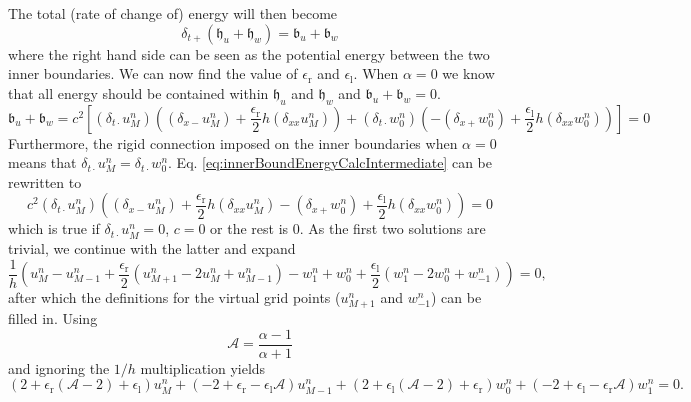 \documentclass[dvipsnames]{article}
\def\Iterm{\mathcal{A}}
\begin{document}
The total (rate of change of) energy will then become 
\begin{equation}
    \delta_{t+}\left(\mathfrak{h}_u + \mathfrak{h}_w\right) = \mathfrak{b}_u + \mathfrak{b}_w
\end{equation}
where the right hand side can be seen as the potential energy between the two inner boundaries. We can now find the value of $\epsilon_\text{r}$ and $\epsilon_\text{l}$. When $\alpha = 0$ we know that all energy should be contained within $\mathfrak{h}_u$ and $\mathfrak{h}_w$ and $\mathfrak{b}_u + \mathfrak{b}_w = 0$. 
\begin{equation}\label{eq:innerBoundEnergyCalcIntermediate}
    \mathfrak{b}_u + \mathfrak{b}_w = c^2\left[(\delta_{t\cdot}u_M^n)\left((\delta_{x-}u_M^n)+\frac{\epsilon_\text{r}}{2}h(\delta_{xx}u_M^n)\right) + (\delta_{t\cdot}w_0^n)\left(-(\delta_{x+}w_0^n)+\frac{\epsilon_\text{l}}{2}h(\delta_{xx}w_0^n)\right)\right]= 0
\end{equation}
Furthermore, the rigid connection imposed on the inner boundaries when $\alpha = 0$ means that $\delta_{t\cdot}u_M^n = \delta_{t\cdot}w_0^n$. Eq. \eqref{eq:innerBoundEnergyCalcIntermediate} can be rewritten to 
\begin{equation*}
    c^2(\delta_{t\cdot}u_M^n)\left((\delta_{x-}u_M^n)+\frac{\epsilon_\text{r}}{2}h(\delta_{xx}u_M^n) -(\delta_{x+}w_0^n)+\frac{\epsilon_\text{l}}{2}h(\delta_{xx}w_0^n)\right)= 0
\end{equation*}
which is true if $\delta_{t\cdot}u_M^n=0$, $c = 0$ or the rest is $0$. As the first two solutions are trivial, we continue with the latter and expand
\begin{equation*}
    \frac{1}{h}\left(u_M^n - u_{M-1}^n +\frac{\epsilon_\text{r}}{2}(u_{M+1}^n-2u_M^n+u_{M-1}^n) -w_1^n + w_0^n + \frac{\epsilon_\text{l}}{2}(w_1^n - 2 w_0^n + w_{-1}^n) \right)= 0,
\end{equation*}
after which the definitions for the virtual grid points ($u_{M+1}^n$ and $w_{-1}^n$) can be filled in. Using 
\begin{equation}
    \Iterm = \frac{\alpha - 1}{\alpha + 1}
\end{equation}
and ignoring the $1/h$ multiplication yields
\begin{equation}
    (2+\epsilon_\text{r}(\Iterm - 2) + \epsilon_\text{l})u_M^n + (-2 + \epsilon_\text{r} - \epsilon_\text{l}\Iterm) u_{M-1}^n + (2+\epsilon_\text{l}(\Iterm - 2) + \epsilon_\text{r})w_0^n + (-2 + \epsilon_\text{l} - \epsilon_\text{r}\Iterm) w_1^n = 0.
\end{equation}
\end{document}
